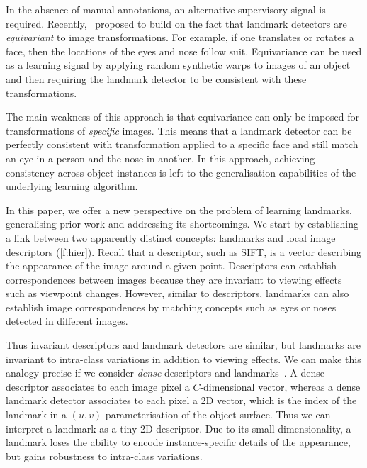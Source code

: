 \documentclass[10pt,twocolumn,letterpaper]{article}
\begin{document}
In the absence of manual annotations, an alternative supervisory signal is required.
Recently,~\cite{thewlis17unsupervised} proposed to build on the fact that landmark detectors are \emph{equivariant} to image transformations.
For example, if one translates or rotates a face, then the locations of the eyes and nose follow suit.
Equivariance can be used as a learning signal by applying random synthetic warps to images of an object and then requiring the landmark detector to be consistent with these transformations.

The main weakness of this approach is that equivariance can only be imposed for transformations of \emph{specific} images.
This means that a landmark detector can be perfectly consistent with transformation applied to a specific face and still match an eye in a person and the nose in another.
In this approach, achieving consistency across object instances is left to the generalisation capabilities of the underlying learning algorithm.

In this paper, we offer a new perspective on the problem of learning landmarks, generalising prior work and addressing its shortcomings.
We start by establishing a link between two apparently distinct concepts: landmarks and local image descriptors (\cref{f:hier}).
Recall that a descriptor, such as SIFT, is a vector describing the appearance of the image around a given point.
Descriptors can establish correspondences between images because they are invariant to viewing effects such as viewpoint changes.
However, similar to descriptors, landmarks can also establish image correspondences by matching concepts such as eyes or noses detected in different images.

Thus invariant descriptors and landmark detectors are similar, but landmarks are invariant to intra-class variations in addition to viewing effects.
We can make this analogy precise if we consider \emph{dense} descriptors and landmarks~\cite{thewlis17Bunsupervised,alp2017densereg,shu2018deforming}.
A dense descriptor associates to each image pixel a $C$-dimensional vector, whereas a dense landmark detector associates to each pixel a 2D vector, which is the index of the landmark in a $(u,v)$ parameterisation of the object surface.
Thus we can interpret a landmark as a tiny 2D descriptor.
Due to its small dimensionality, a landmark loses the ability to encode instance-specific details of the appearance, but gains robustness to intra-class variations.
\end{document}
